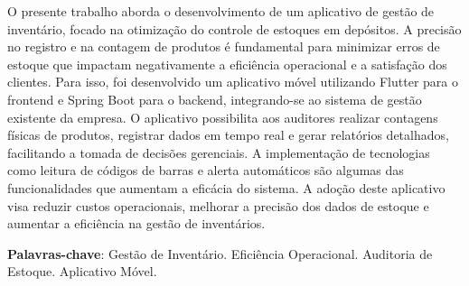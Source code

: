 
O presente trabalho aborda o desenvolvimento de um aplicativo de gestão de inventário, focado na otimização do controle de estoques em depósitos. A precisão no registro e na contagem de produtos é fundamental para minimizar erros de estoque que impactam negativamente a eficiência operacional e a satisfação dos clientes. Para isso, foi desenvolvido um aplicativo móvel utilizando Flutter para o frontend e Spring Boot para o backend, integrando-se ao sistema de gestão existente da empresa. O aplicativo possibilita aos auditores realizar contagens físicas de produtos, registrar dados em tempo real e gerar relatórios detalhados, facilitando a tomada de decisões gerenciais. A implementação de tecnologias como leitura de códigos de barras e alerta automáticos são algumas das funcionalidades que aumentam a eficácia do sistema. A adoção deste aplicativo visa reduzir custos operacionais, melhorar a precisão dos dados de estoque e aumentar a eficiência na gestão de inventários.

\textbf{Palavras-chave}: Gestão de Inventário. Eficiência Operacional. Auditoria de Estoque. Aplicativo Móvel.